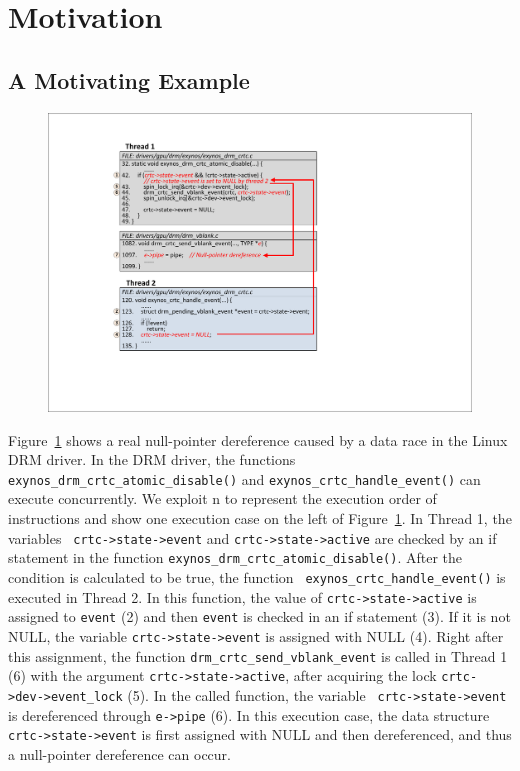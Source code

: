 \section{Motivation}
\label{sec_motivation}

\subsection{A Motivating Example}
\label{subsec_motivating_example}

\begin{figure}[htbp]
	\centering
	\includegraphics[width=1\linewidth]{figures/fig_demo_bug.pdf}
	\label{fig_demo_bug}
\end{figure}

Figure~\ref{fig_demo_bug} shows a real null-pointer dereference caused by a 
data race in the Linux DRM driver. In the DRM driver, the functions {\tt 
exynos\_drm\_crtc\_atomic\_disable()} and {\tt exynos\_crtc\_handle\_event()} 
can execute concurrently. We exploit \textcircled{\footnotesize{n}} to 
represent the execution order of instructions and show one execution case on 
the left of Figure~\ref{fig_demo_bug}. In Thread 1, the variables {\tt 
crtc->state->event} and {\tt crtc->state->active} are checked by an if 
statement in the function {\tt exynos\_drm\_crtc\_atomic\_disable()}. After the 
condition is calculated to be true, the function {\tt 
exynos\_crtc\_handle\_event()} is executed in Thread 2. In this function, the 
value of {\tt crtc->state->active} is assigned to {\tt event} 
(\textcircled{\footnotesize{2}}) and then {\tt event} is checked in an if 
statement (\textcircled{\footnotesize{3}}). If it is not NULL, the variable 
{\tt crtc->state->event} is assigned with NULL 
(\textcircled{\footnotesize{4}}). Right after this assignment, the function 
{\tt drm\_crtc\_send\_vblank\_event} is called  in Thread 1 
(\textcircled{\footnotesize{6}}) with the argument {\tt crtc->state->active}, 
after acquiring the lock {\tt crtc->dev->event\_lock} 
(\textcircled{\footnotesize{5}}). In the called function, the variable {\tt 
crtc->state->event} is dereferenced through {\tt e->pipe} 
(\textcircled{\footnotesize{6}}). In this execution case, the data structure 
{\tt crtc->state->event} is first assigned with NULL and then dereferenced, and 
thus a null-pointer dereference can occur.

